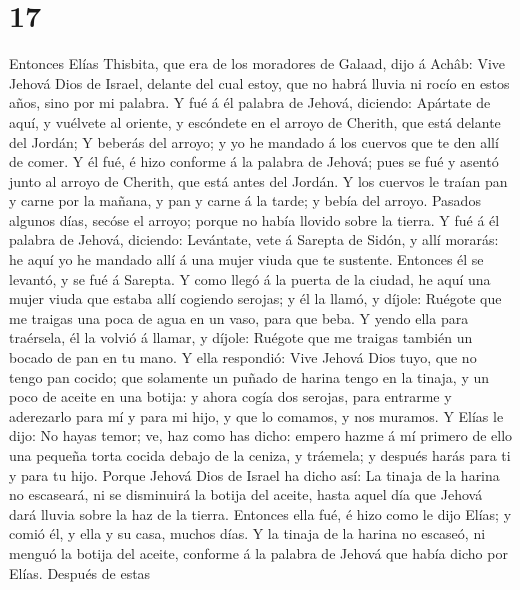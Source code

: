 \hypertarget{section-16}{%
\section{17}\label{section-16}}

 Entonces Elías Thisbita, que era de los moradores de
Galaad, dijo á Achâb: Vive Jehová Dios de Israel, delante del cual
estoy, que no habrá lluvia ni rocío en estos años, sino por mi palabra.
 Y fué á él palabra de Jehová, diciendo: 
Apártate de aquí, y vuélvete al oriente, y escóndete en el arroyo de
Cherith, que está delante del Jordán;  Y beberás del
arroyo; y yo he mandado á los cuervos que te den allí de comer.
 Y él fué, é hizo conforme á la palabra de Jehová; pues se
fué y asentó junto al arroyo de Cherith, que está antes del Jordán.
 Y los cuervos le traían pan y carne por la mañana, y pan
y carne á la tarde; y bebía del arroyo.  Pasados algunos
días, secóse el arroyo; porque no había llovido sobre la tierra.
 Y fué á él palabra de Jehová, diciendo: 
Levántate, vete á Sarepta de Sidón, y allí morarás: he aquí yo he
mandado allí á una mujer viuda que te sustente.  Entonces
él se levantó, y se fué á Sarepta. Y como llegó á la puerta de la
ciudad, he aquí una mujer viuda que estaba allí cogiendo serojas; y él
la llamó, y díjole: Ruégote que me traigas una poca de agua en un vaso,
para que beba.  Y yendo ella para traérsela, él la volvió
á llamar, y díjole: Ruégote que me traigas también un bocado de pan en
tu mano.  Y ella respondió: Vive Jehová Dios tuyo, que no
tengo pan cocido; que solamente un puñado de harina tengo en la tinaja,
y un poco de aceite en una botija: y ahora cogía dos serojas, para
entrarme y aderezarlo para mí y para mi hijo, y que lo comamos, y nos
muramos.  Y Elías le dijo: No hayas temor; ve, haz como
has dicho: empero hazme á mí primero de ello una pequeña torta cocida
debajo de la ceniza, y tráemela; y después harás para ti y para tu hijo.
 Porque Jehová Dios de Israel ha dicho así: La tinaja de
la harina no escaseará, ni se disminuirá la botija del aceite, hasta
aquel día que Jehová dará lluvia sobre la haz de la tierra.
 Entonces ella fué, é hizo como le dijo Elías; y comió
él, y ella y su casa, muchos días.  Y la tinaja de la
harina no escaseó, ni menguó la botija del aceite, conforme á la palabra
de Jehová que había dicho por Elías.  Después de estas
